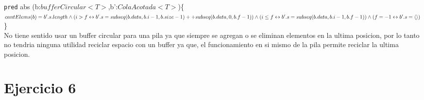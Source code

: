 \documentclass{article}
\newcommand{\abst}[2]{\noindent\texttt{pred} abs (#1)\{#2\}\\}
\begin{document}
\abst{b:$bufferCircular<T>$,b':$ColaAcotada<T>$}{$cantElems(b)=b'.s.length \land \\
(i>f \leftrightarrow b'.s = subseq(b.data,b.i-1,b.size-1)++subseq(b.data,0,b.f-1))\land\\
(i\leq f \leftrightarrow b'.s=subseq(b.data,b.i-1,b.f-1))\land (f=-1 \leftrightarrow b'.s=\langle\rangle)$}

No tiene sentido usar un buffer circular para una pila ya que siempre se agregan o se eliminan elementos
en la ultima posicion, por lo tanto no tendria ninguna utilidad reciclar espacio con un buffer ya que, 
el funcionamiento en si mismo de la pila permite reciclar la ultima posicion.

\section*{Ejercicio 6}
\end{document}
